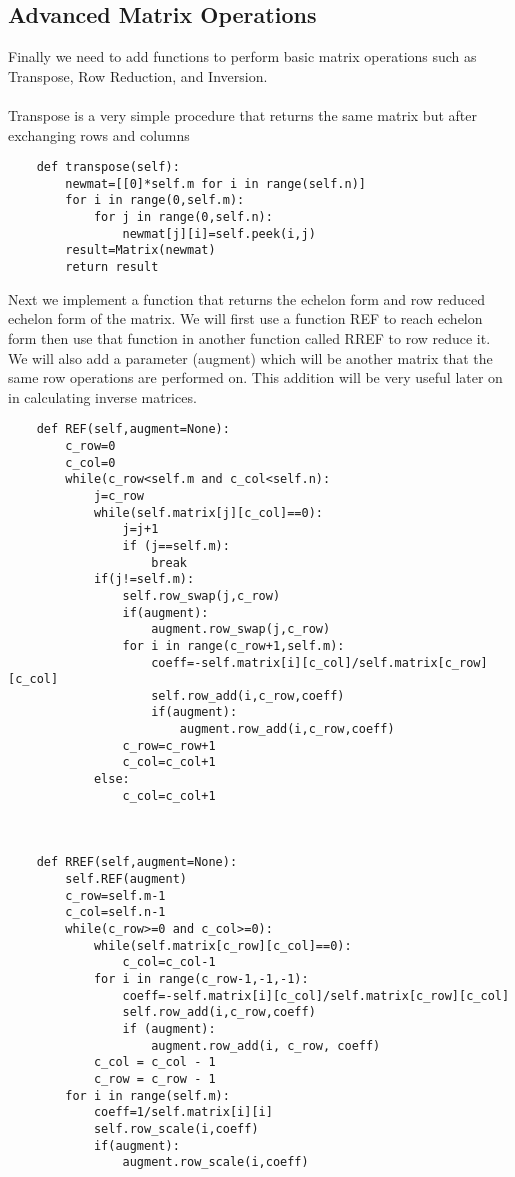 \subsection{Advanced Matrix Operations}
Finally we need to add functions to perform basic matrix operations such as Transpose, Row Reduction, and Inversion.\\
\\Transpose is a very simple procedure that returns the same matrix but after exchanging rows and columns
 \begin{lstlisting}
    def transpose(self):
        newmat=[[0]*self.m for i in range(self.n)]
        for i in range(0,self.m):
            for j in range(0,self.n):
                newmat[j][i]=self.peek(i,j)
        result=Matrix(newmat)
        return result
 \end{lstlisting}
Next we implement a function that returns the echelon form and row reduced echelon form of
the matrix. We will first use a function REF to reach echelon form then use that function in another function called RREF to row reduce it. 
We will also add a parameter (augment) which will be another matrix that the same row operations are performed on.
This addition will be very useful later on in calculating inverse matrices.
 \begin{lstlisting}
    def REF(self,augment=None):
        c_row=0
        c_col=0
        while(c_row<self.m and c_col<self.n):
            j=c_row
            while(self.matrix[j][c_col]==0):
                j=j+1
                if (j==self.m):
                    break
            if(j!=self.m):
                self.row_swap(j,c_row)
                if(augment):
                    augment.row_swap(j,c_row)
                for i in range(c_row+1,self.m):
                    coeff=-self.matrix[i][c_col]/self.matrix[c_row][c_col]
                    self.row_add(i,c_row,coeff)
                    if(augment):
                        augment.row_add(i,c_row,coeff)
                c_row=c_row+1
                c_col=c_col+1
            else:
                c_col=c_col+1



    def RREF(self,augment=None):
        self.REF(augment)
        c_row=self.m-1
        c_col=self.n-1
        while(c_row>=0 and c_col>=0):
            while(self.matrix[c_row][c_col]==0):
                c_col=c_col-1
            for i in range(c_row-1,-1,-1):
                coeff=-self.matrix[i][c_col]/self.matrix[c_row][c_col]
                self.row_add(i,c_row,coeff)
                if (augment):
                    augment.row_add(i, c_row, coeff)
            c_col = c_col - 1
            c_row = c_row - 1
        for i in range(self.m):
            coeff=1/self.matrix[i][i]
            self.row_scale(i,coeff)
            if(augment):
                augment.row_scale(i,coeff)
 \end{lstlisting}
